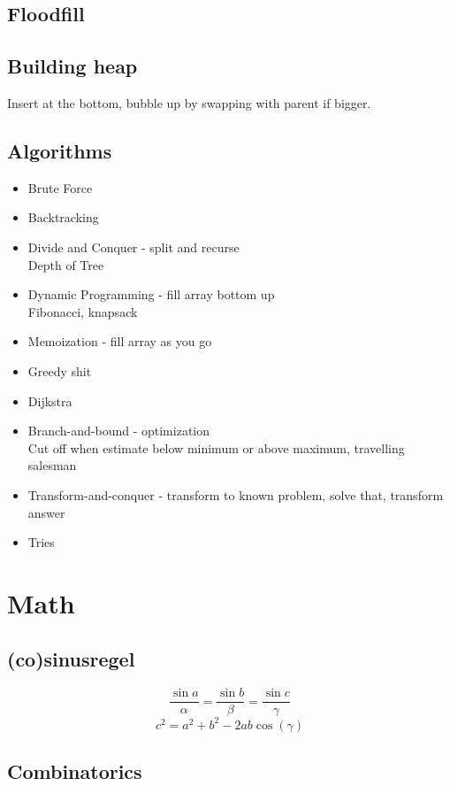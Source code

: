 \documentclass[10pt]{article}
\begin{document}
\subsection{Floodfill}


\subsection{Building heap}
Insert at the bottom, bubble up by swapping with parent if bigger.

\subsection{Algorithms}
\begin{itemize}
\item Brute Force
\item Backtracking
\item Divide and Conquer - split and recurse \\
	Depth of Tree
\item Dynamic Programming - fill array bottom up \\
	Fibonacci, knapsack
\item Memoization - fill array as you go
\item Greedy shit
\item Dijkstra
\item Branch-and-bound - optimization \\
	Cut off when estimate below minimum or above maximum, travelling salesman
\item Transform-and-conquer - transform to known problem, solve that, transform answer
\item Tries
\end{itemize}

\section{Math}
\subsection{(co)sinusregel}

\[\frac{\sin a}{\alpha} = \frac{\sin b}{\beta} =\frac{\sin c}{\gamma}\]
\[c^2=a^2+b^2-2ab\cos(\gamma)\]

\subsection{Combinatorics}
\end{document}
